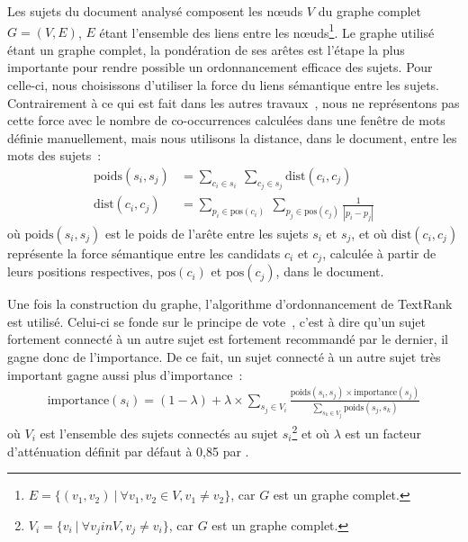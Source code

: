    Les sujets du document analysé composent les n\oe{}uds $V$ du graphe complet
    $G = (V, E)$, $E$ étant l'ensemble des liens entre les
    n\oe{}uds\footnote{$E = \{(v_1, v_2)\ |\ \forall{v_1, v_2 \in V}, v_1 \neq v_2\}$,
    car $G$ est un graphe complet.}. Le graphe utilisé étant un graphe complet,
    la pondération de ses arêtes est l'étape la plus importante pour rendre
    possible un ordonnancement efficace des sujets. Pour celle-ci, nous 
    choisissons d'utiliser la force du liens sémantique entre les sujets.
    Contrairement à ce qui est fait dans les autres
    travaux~\cite{wan2008expandrank,tsatsaronis2010semanticrank,liu2010topicalpagerank},
    nous ne représentons pas cette force avec le nombre de co-occurrences
    calculées dans une fenêtre de mots définie manuellement, mais nous utilisons
    la distance, dans le document, entre les mots des sujets~:
    \begin{align}
      \text{poids}(s_i, s_j) &= \sum_{c_i \in s_i}\ \sum_{c_j \in s_j} \text{dist}(c_i, c_j) \label{math:ponderation}\\
      \text{dist}(c_i, c_j) &= \sum_{p_i \in \text{pos}(c_i)}\ \sum_{p_j \in \text{pos}(c_j)} \frac{1}{|p_i - p_j|} \label{math:distance}
    \end{align}
    où $\text{poids}(s_i, s_j)$ est le poids de l'arête entre les sujets $s_i$
    et $s_j$, et où $\text{dist}(c_i, c_j)$ représente la force sémantique entre
    les candidats $c_i$ et $c_j$, calculée à partir de leurs positions
    respectives, $\text{pos}(c_i)$ et $\text{pos}(c_j)$, dans le document.

    Une fois la construction du graphe, l'algorithme d'ordonnancement de
    TextRank est utilisé. Celui-ci se fonde sur le principe de \og vote~\fg,
    c'est à dire qu'un sujet fortement connecté à un autre sujet est fortement
    recommandé par le dernier, il gagne donc de l'importance. De ce fait, un
    sujet connecté à un autre sujet très important gagne aussi plus
    d'importance~:
    \begin{align}
      \text{importance}(s_i) = (1 - \lambda) + \lambda \times \sum_{s_j \in V_i} \frac{\text{poids}(s_i, s_j) \times \text{importance}(s_j)}{\sum_{s_k \in V_j} \text{poids}(s_j, s_k)} \label{math:textrank}
    \end{align}
    où $V_i$ est l'ensemble des sujets connectés au sujet
    $s_i$\footnote{$V_i = \{v_i\ |\ \forall{v_j in V}, v_j \neq v_i\}$,
    car $G$ est un graphe complet.} et où $\lambda$ est un facteur d'atténuation
    définit par défaut à 0,85 par .


